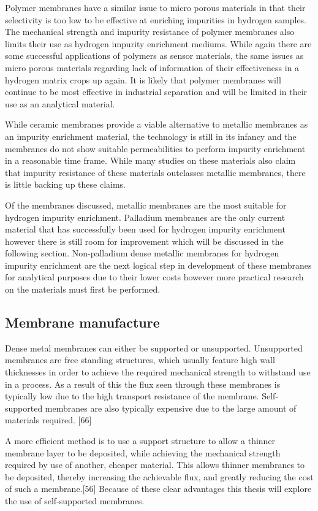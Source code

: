Polymer membranes have a similar issue to micro porous materials in that their selectivity 
is too low to be effective at enriching impurities in hydrogen samples. The mechanical 
strength and impurity resistance of polymer membranes also limits their use as hydrogen 
impurity enrichment mediums. While again there are some successful applications of polymers 
as sensor materials, the same issues as micro porous materials regarding lack of information 
of their effectiveness in a hydrogen matrix crops up again. It is likely that polymer 
membranes will continue to be most effective in industrial separation and will be limited in 
their use as an analytical material. 

While ceramic membranes provide a viable alternative to metallic membranes as an impurity 
enrichment material, the technology is still in its infancy and the membranes do not show 
suitable permeabilities to perform impurity enrichment in a reasonable time frame. While many 
studies on these materials also claim that impurity resistance of these materials outclasses 
metallic membranes, there is little backing up these claims.  

Of the membranes discussed, metallic membranes are the most suitable for hydrogen impurity 
enrichment.  Palladium membranes are the only current material that has successfully been 
used for hydrogen impurity enrichment however there is still room for improvement which will 
be discussed in the following section. Non-palladium dense metallic membranes for hydrogen 
impurity enrichment are the next logical step in development of these membranes for 
analytical purposes due to their lower costs however more practical research on the materials 
must first be performed.

\subsection{Membrane manufacture}
Dense metal membranes can either be supported or unsupported. Unsupported membranes are free 
standing structures, which usually feature high wall thicknesses in order to achieve the 
required mechanical strength to withstand use in a process. As a result of this the flux 
seen through these membranes is typically low due to the high transport resistance of the 
membrane. Self-supported membranes are also typically expensive due to the large amount of 
materials required. [66]

A more efficient method is to use a support structure to allow a thinner membrane layer to 
be deposited, while achieving the mechanical strength required by use of another, cheaper 
material. This allows thinner membranes to be deposited, thereby increasing the achievable 
flux, and greatly reducing the cost of such a membrane.[56] Because of these clear advantages 
this thesis will explore the use of self-supported membranes. 

